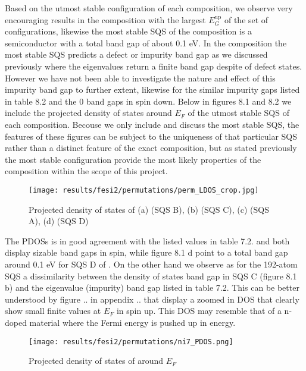 Based on the utmost stable configuration of each composition, we observe very encouraging results in the  composition with the largest $E_G ^\text{up}$ of the set of configurations, likewise the most stable SQS of the  composition is a semiconductor with a total band gap of about 0.1 eV. In the composition  the most stable SQS predicts a defect or impurity band gap as we discussed previously where the eigenvalues return a finite band gap despite of defect states. However we have not been able to investigate the nature and effect of this impurity band gap to further extent, likewise for the similar impurity gaps listed in table 8.2 and the 0 band gaps in spin down. Below in figures 8.1 and 8.2 we include the projected density of states around $E_F$ of the utmost stable SQS of each composition. Becouse we only include and discuss the most stable SQS, the features of these figures can be subject to the uniqueness of that particular SQS rather than a distinct feature of the exact composition, but as stated previously the most stable configuration provide the most likely properties of the composition within the scope of this project. 

\begin{figure}[H]
\texttt{[image: results/fesi2/permutations/perm\_LDOS\_crop.jpg]}
\caption{Projected density of states of (a)  (SQS B), (b)  (SQS C), (c)  (SQS A), (d)  (SQS D)}
\end{figure}

The PDOSs is in good agreement with the listed values in table 7.2.   and  both display sizable band gaps in spin, while figure 8.1 d point to a total band gap around 0.1 eV for SQS D of . On the other hand we observe as for the 192-atom SQS a dissimilarity between the density of states band gap in  SQS C (figure 8.1 b) and the eigenvalue (impurity) band gap listed in table 7.2. This can be better understood by figure .. in appendix .. that display a zoomed in DOS that clearly show small finite values at $E_F$ in spin up. This DOS may resemble that of a n-doped material where the Fermi energy is pushed up in energy.    

\begin{figure}[H]
	\centering
	\texttt{[image: results/fesi2/permutations/ni7\_PDOS.png]}
	\caption{Projected density of states of  around $E_F$}
\end{figure}

